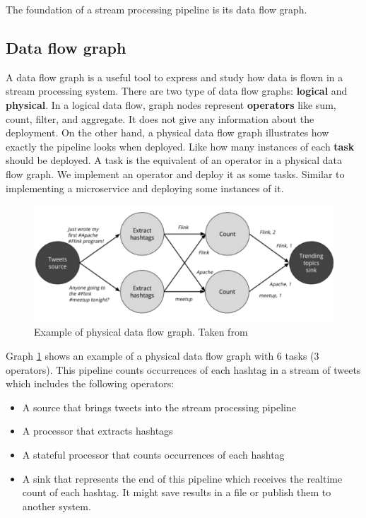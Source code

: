 \documentclass[a4]{report}
\begin{document}
    The foundation of a stream processing pipeline is its data flow graph.

    \subsection{Data flow graph}
    A data flow graph is a useful tool to express and study how data is flown in a stream processing system.
    There are two type of data flow graphs: \textbf{logical} and \textbf{physical}.
    In a logical data flow, graph nodes represent \textbf{operators} like sum, count, filter, and aggregate.
    It does not give any information about the deployment.
    On the other hand, a physical data flow graph illustrates how exactly the pipeline looks when deployed.
    Like how many instances of each \textbf{task} should be deployed.
    A task is the equivalent of an operator in a physical data flow graph.
    We implement an operator and deploy it as some tasks.
    Similar to implementing a microservice and deploying some instances of it.

    \begin{figure}[ht]
        \caption{Example of physical data flow graph. Taken from \cite{flink}}
        \label{physical-data-flow-graph-example}
        \includegraphics[width=\linewidth, scale=0.6]{images/physical-data-flow-graph.png}
    \end{figure}

    Graph \ref{physical-data-flow-graph-example} shows an example of a physical data flow graph with 6 tasks (3
    operators).
    This pipeline counts occurrences of each hashtag in a stream of tweets which includes the following operators:

    \begin{itemize}
        \item A source that brings tweets into the stream processing pipeline
        \item A processor that extracts hashtags
        \item A stateful processor that counts occurrences of each hashtag
        \item A sink that represents the end of this pipeline which receives the realtime count of each hashtag. It might
        save results in a file or publish them to another system.
    \end{itemize}
\end{document}
